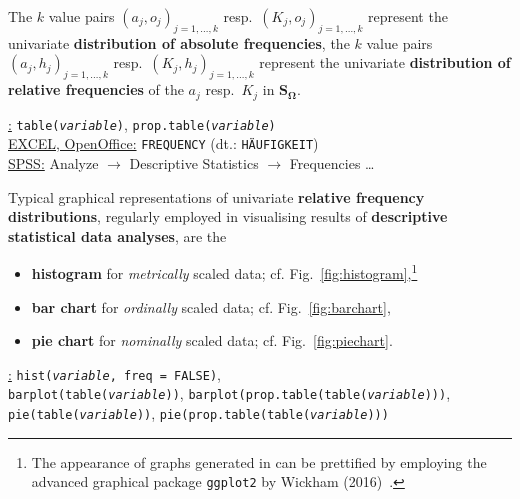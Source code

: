 \medskip
\noindent
The $k$ value pairs $(a_{j},o_{j})_{j=1,\ldots,k}$ resp.\ 
$(K_{j},o_{j})_{j=1,\ldots,k}$ represent the univariate \textbf{
distribution of absolute frequencies}, the $k$ value pairs 
$(a_{j},h_{j})_{j=1,\ldots,k}$
resp.\ $(K_{j},h_{j})_{j=1,\ldots,k}$ represent the univariate 
\textbf{distribution of relative frequencies} of the $a_{j}$
resp.\ $K_{j}$ in $\boldsymbol{S_{\Omega}}$.

\medskip
\noindent
\underline{\R:} \texttt{table(\textit{variable})},
\texttt{prop.table(\textit{variable})} \\
\underline{EXCEL, OpenOffice:} \texttt{FREQUENCY} (dt.:
\texttt{H\"AUFIGKEIT})\\
\underline{SPSS:} Analyze $\rightarrow$ Descriptive Statistics
$\rightarrow$ Frequencies \ldots

\medskip
\noindent
Typical graphical representations of univariate \textbf{relative 
frequency distributions}, regularly employed in visualising 
results of \textbf{descriptive statistical data analyses}, are the
%
\begin{itemize}

\item \textbf{histogram} for \textit{metrically} scaled data;
cf. Fig.~\ref{fig:histogram},\footnote{The appearance of graphs
generated in \R{} can be prettified by employing the advanced
graphical package \texttt{ggplot2} by Wickham (2016)~.}

\item \textbf{bar chart} for \textit{ordinally} scaled data;
cf. Fig.~\ref{fig:barchart},

\item \textbf{pie chart} for \textit{nominally} scaled data;
cf. Fig.~\ref{fig:piechart}.
\end{itemize}
%

\medskip
\noindent
\underline{\R:} \texttt{hist(\textit{variable}, freq = FALSE)}, \\
\texttt{barplot(table(\textit{variable}))},
\texttt{barplot(prop.table(table(\textit{variable})))}, \\
\texttt{pie(table(\textit{variable}))},
\texttt{pie(prop.table(table(\textit{variable})))}

